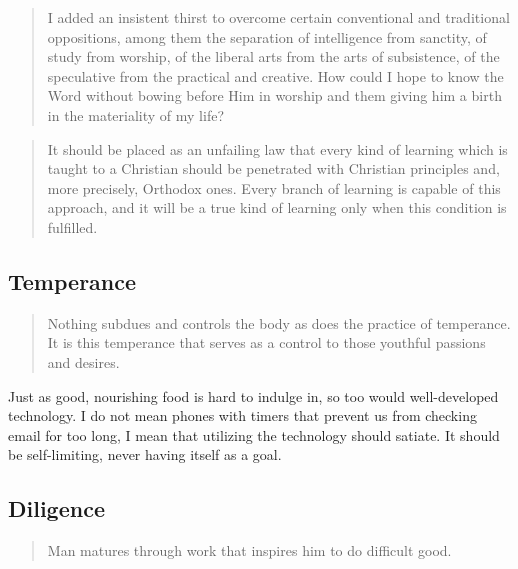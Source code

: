 \documentclass[letterpaper]{article}
\begin{document}
\begin{quote}
  I added an insistent thirst to overcome certain conventional and traditional oppositions, among them the separation of intelligence from sanctity, of study from worship, of the liberal arts from the arts of subsistence, of the speculative from the practical and creative. How could I hope to know the Word without bowing before Him in worship and them giving him a birth in the materiality of my life?
\end{quote}

\begin{quote}
  It should be placed as an unfailing law that every kind of learning which is taught to a Christian should be penetrated with Christian principles and, more precisely, Orthodox ones. Every branch of learning is capable of this approach, and it will be a true kind of learning only when this condition is fulfilled.
\end{quote}


\subsection{Temperance}

\begin{quote}
  Nothing subdues and controls the body as does the practice of temperance. It is this temperance that serves as a control to those youthful passions and desires.
\end{quote}

Just as good, nourishing food is hard to indulge in, so too would well-developed technology. I do not mean phones with timers that prevent us from checking email for too long, I mean that utilizing the technology should satiate. It should be self-limiting, never having itself as a goal.

\subsection{Diligence}

\begin{quote}
  Man matures through work that inspires him to do difficult good.
\end{quote}
\end{document}
